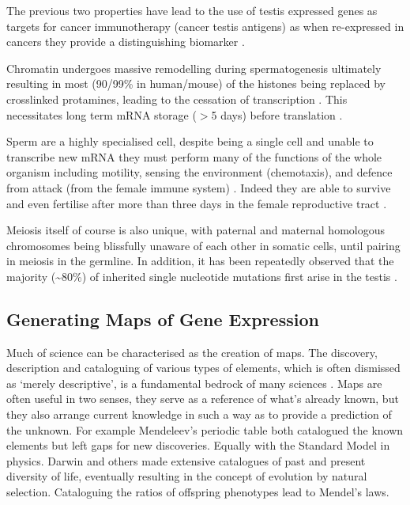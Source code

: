  The previous two properties have lead to the use of testis expressed genes as targets for cancer immunotherapy (cancer testis antigens) as when re-expressed in cancers they provide a distinguishing biomarker \parencite{Whitehurst2014Cause}.

Chromatin undergoes massive remodelling during spermatogenesis ultimately resulting in most (90/99\% in human/mouse) of the histones being replaced by crosslinked protamines, leading to the cessation of transcription \parencite{Rathke2014Chromatin}.
This necessitates long term mRNA storage ($>$5 days) before translation \parencite{Kleene2013Connecting}.

Sperm are a highly specialised cell, despite being a single cell and unable to transcribe new mRNA they must perform many of the functions of the whole organism including motility, sensing the environment (chemotaxis), and defence from attack (from the female immune system) \parencite{Kaupp2008Mechanisms, Thompson1992Leukocytic}.
Indeed they are able to survive and even fertilise after more than three days in the female reproductive tract \parencite{Gould1984Assessment,Wilcox1995Timing}.

Meiosis itself of course is also unique, with paternal and maternal homologous chromosomes being blissfully unaware of each other in somatic cells, until pairing in meiosis in the germline.
In addition, it has been repeatedly observed that the majority (\textasciitilde80\%) of inherited single nucleotide mutations first arise in the testis \parencite{Kong2012Rate, Michaelson2012WholeGenome, Goldmann2016Parentoforiginspecific, Rahbari2016Timing, Jonsson2017Parental}.



\subsection{Generating Maps of Gene Expression}
Much of science can be characterised as the creation of maps.
The discovery, description and cataloguing of various types of elements, which is often dismissed as `merely descriptive', is a fundamental bedrock of many sciences \parencite{Grimaldi2007Why}.
Maps are often useful in two senses, they serve as a reference of what's already known, but they also arrange current knowledge in such a way as to provide a prediction of the unknown.
For example Mendeleev's periodic table both catalogued the known elements but left gaps for new discoveries.
Equally with the Standard Model in physics.
Darwin and others made extensive catalogues of past and present diversity of life, eventually resulting in the concept of evolution by natural selection.
Cataloguing the ratios of offspring phenotypes lead to Mendel's laws.

